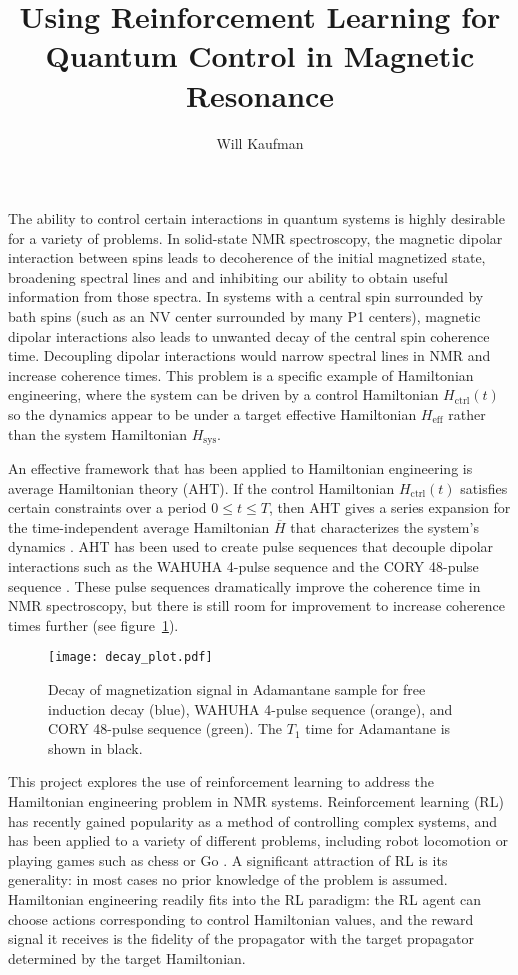 \documentclass{article}
\title{Using Reinforcement Learning for Quantum Control in Magnetic Resonance}
\author{Will Kaufman}
\begin{document}
\maketitle

The ability to control certain interactions in quantum systems is highly desirable for a variety of problems. In solid-state NMR spectroscopy, the magnetic dipolar interaction between spins leads to decoherence of the initial magnetized state, broadening spectral lines and and inhibiting our ability to obtain useful information from those spectra. In systems with a central spin surrounded by bath spins (such as an NV center surrounded by many P1 centers),
magnetic dipolar interactions also leads to unwanted decay of the central spin coherence time. Decoupling dipolar interactions would narrow spectral lines in NMR and increase coherence times. This problem is a specific example of Hamiltonian engineering, where the system can be driven by a control Hamiltonian $H_{\text{ctrl}}(t)$ so the dynamics appear to be under a target effective Hamiltonian $H_{\text{eff}}$ rather than the system Hamiltonian $H_{\text{sys}}$.

An effective framework that has been applied to Hamiltonian engineering is average Hamiltonian theory (AHT). If the control Hamiltonian $H_{\text{ctrl}}(t)$ satisfies certain constraints over a period $0 \le t \le T$, then AHT gives a series expansion for the time-independent average Hamiltonian $\overline{H}$ that characterizes the system's dynamics \cite{1976ii, gerstein-dybowski}. AHT has been used to create pulse sequences that decouple dipolar interactions such as the WAHUHA 4-pulse sequence \cite{PhysRevLett.20.180} and the CORY 48-pulse sequence \cite{CORY1990205}.
These pulse sequences dramatically improve the coherence time in NMR spectroscopy, but there is still room for improvement to increase coherence times further (see figure~\ref{fig:decay_plot}).

\begin{figure}[H]
    \centering
    \texttt{[image: decay\_plot.pdf]}
    \caption{Decay of magnetization signal in Adamantane sample for free induction decay (blue), WAHUHA 4-pulse sequence (orange), and CORY 48-pulse sequence (green). The $T_1$ time for Adamantane is shown in black.}
    \label{fig:decay_plot}
\end{figure}

This project explores the use of reinforcement learning to address the Hamiltonian engineering problem in NMR systems.
Reinforcement learning (RL) has recently gained popularity as a method of controlling complex systems, and has been applied to a variety of different problems, including robot locomotion \cite{lillicrap2015continuous} or playing games such as chess or Go \cite{Silver1140}. A significant attraction of RL is its generality: in most cases no prior knowledge of the problem is assumed.
Hamiltonian engineering readily fits into the RL paradigm: the RL agent can choose actions corresponding to control Hamiltonian values, and the reward signal it receives is the fidelity of the propagator with the target propagator determined by the target Hamiltonian.
\end{document}
